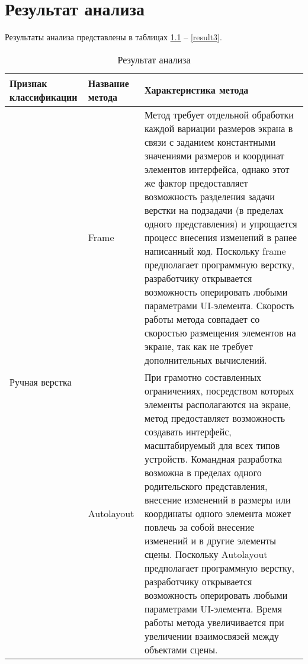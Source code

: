 \chapter{Результат анализа}

Результаты анализа представлены в таблицах \ref{result} -- \ref{result3}.

\begin{table}[H]
	\centering
	\caption{Результат анализа}
	\label{result}
	\begin{tabular}{|p{3.3cm}|p{2.7cm}|p{9.2cm}|}
		\hline
		\textbf{Признак классификации} & \textbf{Название метода} & \textbf{Характеристика метода} \\
		\hline
		\multirow{2}{2.9cm}{Ручная верстка} & 
		Frame & 
		Метод требует отдельной обработки каждой вариации размеров экрана в связи с заданием константными значениями размеров и 
		координат элементов интерфейса, однако этот же фактор предоставляет возможность разделения задачи верстки на подзадачи (в 
		пределах одного представления) и упрощается процесс внесения изменений в ранее написанный код. 
		Поскольку frame предполагает программную верстку, разработчику открывается возможность оперировать любыми параметрами UI-элемента. 
		Скорость работы метода совпадает со скоростью размещения элементов на экране, так как не требует дополнительных вычислений.\\
		\hline
		
		\multirow{2}{2.9cm}{Автомати- верстка} & 
		Autolayout & 
		При грамотно составленных ограничениях, посредством которых элементы располагаются на экране, метод предоставляет 
		возможность создавать интерфейс, масштабируемый для всех типов устройств. 
		Командная разработка возможна в пределах одного родительского представления, внесение изменений в размеры или координаты одного элемента может повлечь за собой внесение 
		изменений и в другие элементы сцены. 
		Поскольку Autolayout предполагает программную верстку, разработчику открывается возможность оперировать любыми параметрами UI-элемента. 
		Время работы метода увеличивается при увеличении взаимосвязей между объектами сцены.\\
		\hline
	\end{tabular}
\end{table}

